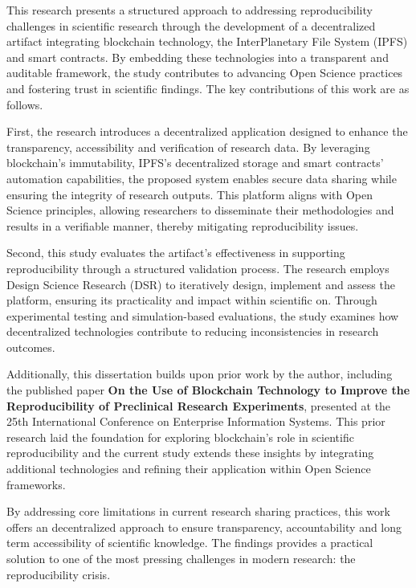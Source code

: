 \documentclass{article}
\begin{document}
This research presents a structured approach to addressing reproducibility challenges in scientific research through the development of a decentralized artifact integrating blockchain technology, the InterPlanetary File System (IPFS) and smart contracts. By embedding these technologies into a transparent and auditable framework, the study contributes to advancing Open Science practices and fostering trust in scientific findings. The key contributions of this work are as follows.

First, the research introduces a decentralized application designed to enhance the transparency, accessibility and verification of research data. By leveraging blockchain's immutability, IPFS’s decentralized storage and smart contracts’ automation capabilities, the proposed system enables secure data sharing while ensuring the integrity of research outputs. This platform aligns with Open Science principles, allowing researchers to disseminate their methodologies and results in a verifiable manner, thereby mitigating reproducibility issues.

Second, this study evaluates the artifact’s effectiveness in supporting reproducibility through a structured validation process. The research employs Design Science Research (DSR) to iteratively design, implement and assess the platform, ensuring its practicality and impact within scientific on. Through experimental testing and simulation-based evaluations, the study examines how decentralized technologies contribute to reducing inconsistencies in research outcomes.

Additionally, this dissertation builds upon prior work by the author, including the published paper \textbf{On the Use of Blockchain Technology to Improve the Reproducibility of Preclinical Research Experiments}\cite{oliveira2023blockchain}, presented at the 25th International Conference on Enterprise Information Systems. This prior research laid the foundation for exploring blockchain’s role in scientific reproducibility and the current study extends these insights by integrating additional technologies and refining their application within Open Science frameworks.

By addressing core limitations in current research sharing practices, this work offers an decentralized approach to ensure transparency, accountability and long term accessibility of scientific knowledge. The findings provides a practical solution to one of the most pressing challenges in modern research: the reproducibility crisis.
\end{document}
